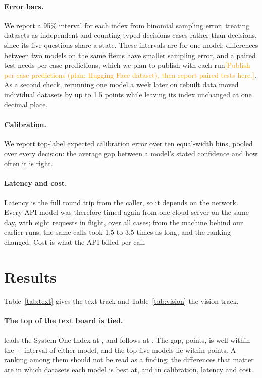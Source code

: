 \documentclass[11pt]{article}
\newcommand{\draftnote}[1]{\textcolor{orange}{[#1]}}
\begin{document}
\paragraph{Error bars.} We report a 95\% interval for each index from binomial sampling error, treating datasets as
independent and counting typed-decisions cases rather than decisions, since its five questions share a state. These
intervals are for one model; differences between two models on the same items have smaller sampling error, and a
paired test needs per-case predictions, which we plan to publish with each run\draftnote{Publish per-case predictions (plan: Hugging Face dataset), then report paired tests here.}. As a second check, rerunning one model a week later on
rebuilt data moved individual datasets by up to 1.5 points while leaving its index unchanged at one decimal place.

\paragraph{Calibration.} We report top-label expected calibration error \citep{naeini2015obtaining,guo2017calibration}
over ten equal-width bins, pooled over every decision: the average gap between a model's stated confidence and how
often it is right.

\paragraph{Latency and cost.} Latency is the full round trip from the caller, so it depends on the network. Every API
model was therefore timed again from one cloud server on the same day, with eight requests in flight, over all
\nCases{} cases; from the machine behind our earlier runs, the same calls took 1.5 to 3.5 times as long, and the
ranking changed. Cost is what the API billed per call.

\section{Results}\label{sec:results}

Table~\ref{tab:text} gives the text track and Table~\ref{tab:vision} the vision track.

\paragraph{The top of the text board is tied.} \topText{} leads the System One Index at \topTextIdx{}, and
\secondText{} follows at \secondTextIdx{}. The gap, \topTextGap{} points, is well within the $\pm$\topTextCI{}
interval of either model, and the top five models lie within \topFiveSpread{} points. A ranking among them should not
be read as a finding; the differences that matter are in which datasets each model is best at, and in calibration,
latency and cost.
\end{document}
